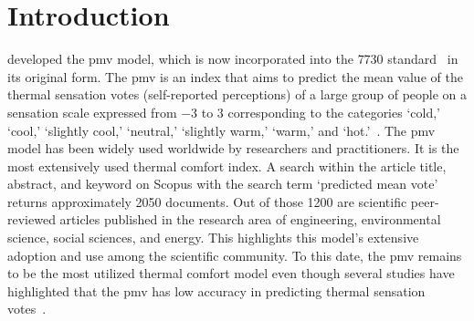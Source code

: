 \section{Introduction}\label{sec:introduction}
 developed the \ac{pmv} model, which is now incorporated into the \gls{7730} standard~\cite{iso7730} in its original form.
The \ac{pmv} is an index that aims to predict the mean value of the thermal sensation votes (self-reported perceptions) of a large group of people on a sensation scale expressed from \num{-3} to \num{3} corresponding to the categories `cold,' `cool,' `slightly cool,' `neutral,' `slightly warm,' `warm,' and `hot.'~\cite{iso7730, ashrae552023}.
The \ac{pmv} model has been widely used worldwide by researchers and practitioners.
It is the most extensively used thermal comfort index.
A search within the article title, abstract, and keyword on Scopus with the search term `predicted mean vote' returns approximately \num{2050} documents.
Out of those \num{1200} are scientific peer-reviewed articles published in the research area of engineering, environmental science, social sciences, and energy.
This highlights this model's extensive adoption and use among the scientific community.
To this date, the \ac{pmv} remains to be the most utilized thermal comfort model even though several studies have highlighted that the \ac{pmv} has low accuracy in predicting thermal sensation votes~\cite{Cheung2019, Yao2022, Humphreys2002, doherty_evaluation_1988}.

